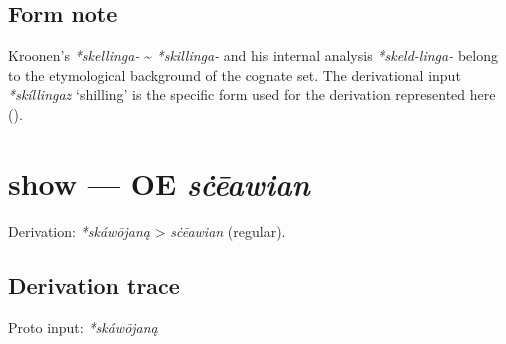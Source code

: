 \documentclass[
  british,
  a4paper,
  openany]{book}
\providecommand{\Recon}[1]{\emph{*#1}}
{\catcode`→=\active \global\def→{\ensuremath{\rightarrow}}}
\providecommand{\texorpdfstring}[2]{#1}
\providecommand{\Recon}[1]{\emph{*#1}}
{\catcode`→=\active \global\def→{\ensuremath{\rightarrow}}}
\begin{document}
\subsection{Form note}\label{form-note-15}

Kroonen's \emph{*skellinga-} \textasciitilde{} \emph{*skillinga-} and
his internal analysis \emph{*skeld-linga-} belong to the etymological
background of the cognate set. The derivational input \Recon{skíllingaz}
`shilling' is the specific form used for the derivation represented here
().

\section{\texorpdfstring{show --- OE
\emph{sċēawian}}{show --- OE sċēawian}}\label{show-oe-sux10bux113awian}


Derivation: \emph{*skáwōjaną} \textgreater{} \emph{sċēawian} (regular).

\subsection{Derivation trace}\label{derivation-trace-45}

Proto input: \emph{*skáwōjaną}

\begingroup
\setlength{\fboxsep}{6pt}
\end{document}
